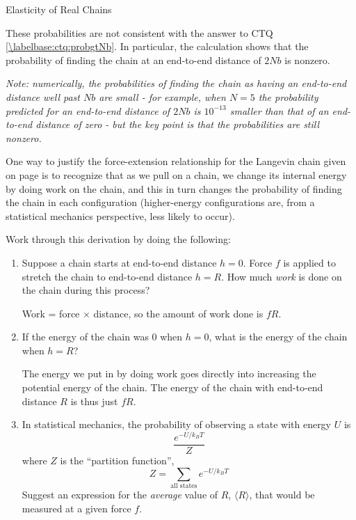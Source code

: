 \begin{activity}[extension]{Elasticity of Real Chains}
\begin{exercises}
\begin{enumerate}
				\begin{solution}{}
					These probabilities are not consistent with the answer to CTQ \ref{\labelbase:ctq:probgtNb}.  In particular, the calculation shows that the probability of finding the chain at an end-to-end distance of $2Nb$ is nonzero.
					
					\emph{Note: numerically, the probabilities of finding the chain as having an end-to-end distance well past $Nb$ are small - for example, when $N=5$ the probability predicted for an end-to-end distance of $2Nb$ is $10^{-13}$ smaller than that of an end-to-end distance of zero - but the key point is that the probabilities are still \emph{nonzero}.}
				\end{solution}

		\end{enumerate}

%
	\exercise \label{\labelbase:exc:langevinderivation} One way to justify the force-extension relationship for the Langevin chain given on page \pageref{\labelbase:eqn:Fdlangevin} is to recognize that as we pull on a chain, we change its internal energy by doing work on the chain, and this in turn changes the probability of finding the chain in each configuration (higher-energy configurations are, from a statistical mechanics perspective, less likely to occur).
	
	Work through this derivation by doing the following:

	\begin{enumerate}
		\item Suppose a chain starts at end-to-end distance $h=0$.  Force $f$ is applied to stretch the chain to end-to-end distance $h=R$.  How much \textit{work} is done on the chain during this process?
		
			\begin{solution}{}
				Work = force $\times$ distance, so the amount of work done is $fR$.
			\end{solution}
			
		\item If the energy of the chain was 0 when $h=0$, what is the energy of the chain when $h=R$?
		
			\begin{solution}{}
				The energy we put in by doing work goes directly into increasing the potential energy of the chain.  The energy of the chain with end-to-end distance $R$ is thus just $fR$.
			\end{solution}
			
		\item In statistical mechanics, the probability of observing a state with energy $U$ is
			\begin{equation*}
				\frac{e^{-U/k_B T}}{Z}
			\end{equation*}
			where $Z$ is the ``partition function'',
			\begin{equation*}
				Z = \sum_\text{all states} e^{-U/k_B T}
			\end{equation*}
			Suggest an expression for the \emph{average} value of $R$, $\langle R \rangle$, that would be measured at a given force $f$.
			

\end{enumerate}
\end{exercises}
\end{activity}
